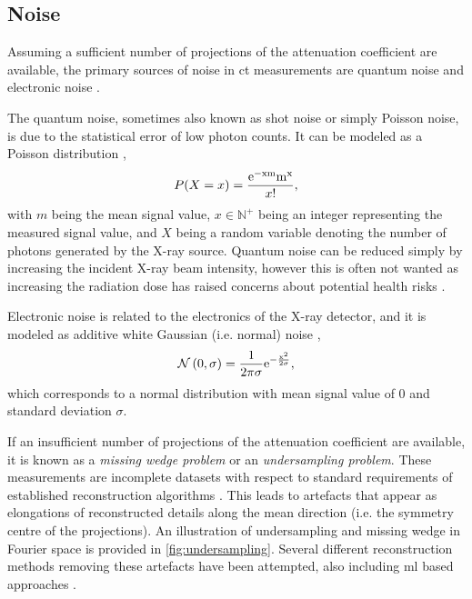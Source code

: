 \subsection{Noise}
\label{sec:ct:theory:noise}
Assuming a sufficient number of projections of the attenuation coefficient are available, the primary sources of noise in \gls{ct} measurements are quantum noise and electronic noise \cite{boas2012ct}. 

The quantum noise, sometimes also known as shot noise or simply Poisson noise, is due to the statistical error of low photon counts. It can be modeled as a Poisson distribution \cite{Whiting2006},
\begin{equation}
    \label{eq:poissonnoise}
    P(X = x) = \frac{\rm{e}^{-xm}m^x}{x!},
\end{equation}
with $m$ being the mean signal value, $x \in \mathbb{N}^+$ being an integer representing the measured signal value, and $X$ being a random variable denoting the number of photons generated by the X-ray source. Quantum noise can be reduced simply by increasing the incident X-ray beam intensity, however this is often not wanted as increasing the radiation dose has raised concerns about potential health risks \cite{doi:10.1056/NEJMra072149,PEARCE2012499}. 

Electronic noise is related to the electronics of the X-ray detector, and it is modeled as additive white Gaussian (i.e. normal) noise \cite{boas2012ct},
\begin{equation}
    \mathcal{N}\left(0,\sigma \right) = \frac{1}{2\pi\sigma}\rm{e}^{-\frac{x^2}{2\sigma}},
\end{equation}
which corresponds to a normal distribution with mean signal value of $0$ and standard deviation $\sigma$.

If an insufficient number of projections of the attenuation coefficient are available, it is known as a \textit{missing wedge problem} or an \textit{undersampling problem}. These measurements are incomplete datasets with respect to standard requirements of established reconstruction algorithms \cite{10.1111/jmi.12313}. This leads to artefacts that appear as elongations of reconstructed details along the mean direction (i.e. the symmetry centre of the projections). An illustration of undersampling and missing wedge in Fourier space is provided in \cref{fig:undersampling}. Several different reconstruction methods removing these artefacts have been attempted, also including \gls{ml} based approaches \cite{liu2020tomogan,GANrec}. 

